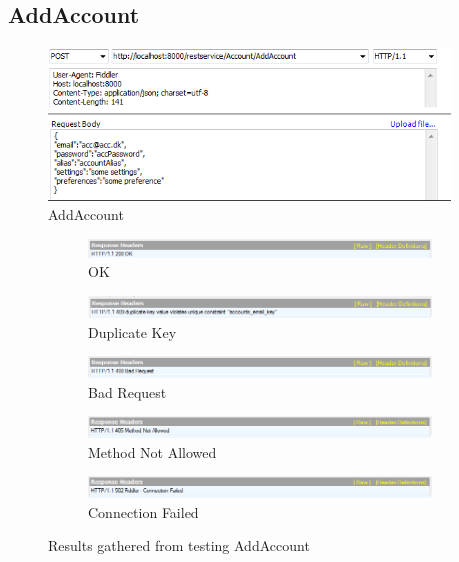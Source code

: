 \subsection{AddAccount}
\begin{figure}
\centering
\includegraphics[width=0.95\textwidth]{Pictures/test/composeraddaccount.png}
\caption{AddAccount}
\label{fig:composeraddaccount}
\end{figure}

\begin{figure}
	\centering
	\begin{subfigure}[b]{\textwidth}
		\includegraphics[width=\textwidth]{Pictures/test/AddAccountOK.png}
		\caption{OK}
		\label{fig:AddAccountOK}
	\end{subfigure}
	\begin{subfigure}[b]{\textwidth}
		\includegraphics[width=\textwidth]{Pictures/test/AddAccountduplicate.png}
		\caption{Duplicate Key}
		\label{fig:AddAccountduplicate}
	\end{subfigure}
	\begin{subfigure}[b]{\textwidth}
		\includegraphics[width=\textwidth]{Pictures/test/AddAccountbadrequest.png}
		\caption{Bad Request}
		\label{fig:AddAccountbadrequest}
	\end{subfigure}
	\begin{subfigure}[b]{\textwidth}
		\includegraphics[width=\textwidth]{Pictures/test/AddAccountmethodnotallowed.png}
		\caption{Method Not Allowed}
		\label{fig:AddAccountmethodnotallowed}
	\end{subfigure}
	\begin{subfigure}[b]{\textwidth}
		\includegraphics[width=\textwidth]{Pictures/test/AddAccountconnectionfailed.png}
		\caption{Connection Failed}
		\label{fig:AddAccountconnectionfailed}
	\end{subfigure}
	\caption{Results gathered from testing AddAccount}
	\label{fig:addaccountresults}
\end{figure}

